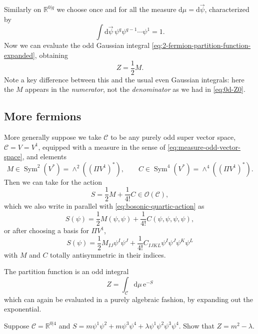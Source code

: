 \documentclass[12pt,letterpaper,reqno]{article}
\numberwithin{equation}{section}
\newcommand{\cC}{\ensuremath{\mathcal C}}
\newcommand{\cO}{\ensuremath{\mathcal O}}
\newcommand{\R}{\ensuremath{\mathbb R}}
\newcommand{\half}{\ensuremath{\frac{1}{2}}}
\newcommand{\e}{{\mathrm e}}
\newcommand{\de}{\mathrm{d}}
\newcommand{\ti}[1]{\textit{#1}}
\DeclareMathOperator{\Sym}{Sym}
\begin{document}
Similarly on $\R^{0 \vert q}$ we choose once and for all the 
measure $\de \mu = \de \vec\psi$, characterized by
\begin{equation}
  \int \de \vec\psi \, \psi^q \psi^{q-1} \cdots \psi^1 = 1.
\end{equation}
Now we can evaluate the odd Gaussian integral \eqref{eq:2-fermion-partition-function-expanded}, obtaining
\begin{equation} \label{eq:2d-odd-gaussian}
 Z = \half M.  
\end{equation}
Note a key difference between this and the usual even Gaussian integrals:
here the $M$ appears in the \ti{numerator}, not the \ti{denominator}
as we had in \eqref{eq:0d-Z0}.


\subsection{More fermions}

More generally suppose we take $\cC$ to be any 
purely odd super vector space, $\cC = V = V^1$,
equipped with a measure in the sense of \eqref{eq:measure-odd-vector-space},
and elements
\begin{equation}
 M \in \Sym^2(V^*) = \wedge^2((\Pi V^1)^*), \qquad C \in \Sym^4(V^*) = \wedge^4((\Pi V^1)^*).
\end{equation}
Then we can take for the action
\begin{equation}
 S = \half M + \frac{1}{4!} C \in \cO(\cC),
\end{equation}
which we also write in parallel with \eqref{eq:bosonic-quartic-action} as
\begin{equation}
  S(\psi) = \half M(\psi,\psi) + \frac{1}{4!} C(\psi, \psi, \psi, \psi),
\end{equation}
or after choosing a basis for $\Pi V^1$,
\begin{equation}
  S(\psi) = \half M_{IJ} \psi^I \psi^J + \frac{1}{4!} C_{IJKL} \psi^I \psi^J \psi^K \psi^L
\end{equation}
with $M$ and $C$ totally antisymmetric in their indices.

The partition function is an odd integral
\begin{equation}
  Z = \int_\cC \de \mu \, \e^{-S}
\end{equation}
which can again be evaluated in a purely algebraic fashion, by expanding
out the exponential.
\begin{exercise}
Suppose $\cC = \R^{0 \vert 4}$
and $S = m \psi^1 \psi^2 + m \psi^3 \psi^4 + \lambda \psi^1 \psi^2 \psi^3 \psi^4$. Show that $Z = m^2 - \lambda$.
\end{exercise}
\end{document}
